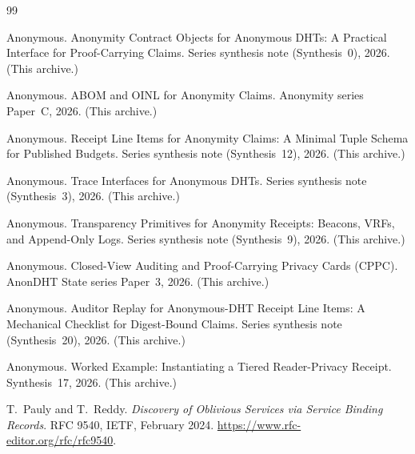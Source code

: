 \documentclass[11pt]{article}
\begin{document}
\begin{thebibliography}{99}\small

Anonymous.
\newblock Anonymity Contract Objects for Anonymous DHTs: A Practical Interface for Proof-Carrying Claims.
\newblock Series synthesis note (Synthesis~0), 2026. (This archive.)

Anonymous.
\newblock ABOM and OINL for Anonymity Claims.
\newblock Anonymity series Paper~C, 2026. (This archive.)

Anonymous.
\newblock Receipt Line Items for Anonymity Claims: A Minimal Tuple Schema for Published Budgets.
\newblock Series synthesis note (Synthesis~12), 2026. (This archive.)

Anonymous.
\newblock Trace Interfaces for Anonymous DHTs.
\newblock Series synthesis note (Synthesis~3), 2026. (This archive.)

Anonymous.
\newblock Transparency Primitives for Anonymity Receipts: Beacons, VRFs, and Append-Only Logs.
\newblock Series synthesis note (Synthesis~9), 2026. (This archive.)

Anonymous.
\newblock Closed-View Auditing and Proof-Carrying Privacy Cards (CPPC).
\newblock AnonDHT State series Paper~3, 2026. (This archive.)

Anonymous.
\newblock Auditor Replay for Anonymous-DHT Receipt Line Items: A Mechanical Checklist for Digest-Bound Claims.
\newblock Series synthesis note (Synthesis~20), 2026. (This archive.)


Anonymous.
\newblock Worked Example: Instantiating a Tiered Reader-Privacy Receipt.
\newblock Synthesis~17, 2026. (This archive.)


T.~Pauly and T.~Reddy.
\newblock \emph{Discovery of Oblivious Services via Service Binding Records}.
\newblock RFC 9540, IETF, February 2024.
\newblock \url{https://www.rfc-editor.org/rfc/rfc9540}.

\end{thebibliography}
\end{document}
